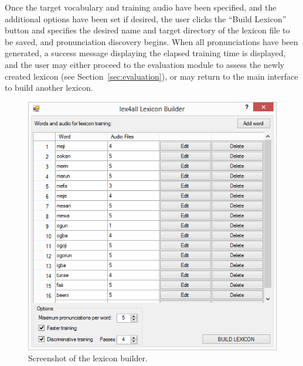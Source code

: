 \documentclass[11pt]{article}
\begin{document}
Once the target vocabulary and training audio have been specified, and the additional options have been set if desired, the user clicks the ``Build Lexicon'' button and specifies the desired name and target directory of the lexicon file to be saved, 
and pronunciation discovery begins. 
When all pronunciations have been generated, a success message displaying the elapsed training time is displayed, and the user may either proceed to the evaluation module to assess the newly created lexicon (see Section~\ref{sec:evaluation}), or may return to the main interface to build another lexicon. 

\begin{figure}[tb]
\begin{center}
\includegraphics[width=\columnwidth]{../screenshots/LexiconBuilder-Main-Filled-scrolling.PNG}
\caption{Screenshot of the lexicon builder.\label{fig:mainform}}
\end{center}
\end{figure}
\end{document}
